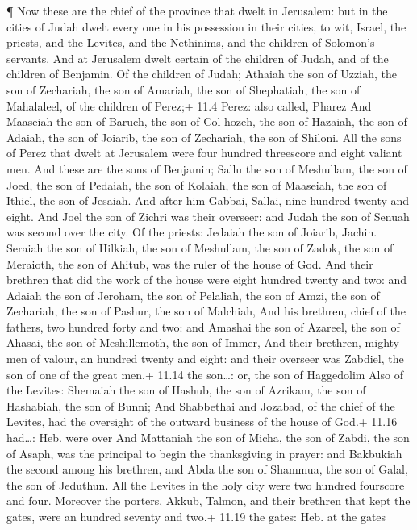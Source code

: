  ¶ Now these are the chief of the province that dwelt in
Jerusalem: but in the cities of Judah dwelt every one in his possession
in their cities, to wit, Israel, the priests, and the Levites, and the
Nethinims, and the children of Solomon's servants.  And at
Jerusalem dwelt certain of the children of Judah, and of the children of
Benjamin. Of the children of Judah; Athaiah the son of Uzziah, the son
of Zechariah, the son of Amariah, the son of Shephatiah, the son of
Mahalaleel, of the children of Perez;+ 11.4 Perez: also called, Pharez
 And Maaseiah the son of Baruch, the son of Col-hozeh, the
son of Hazaiah, the son of Adaiah, the son of Joiarib, the son of
Zechariah, the son of Shiloni.  All the sons of Perez that
dwelt at Jerusalem were four hundred threescore and eight valiant men.
 And these are the sons of Benjamin; Sallu the son of
Meshullam, the son of Joed, the son of Pedaiah, the son of Kolaiah, the
son of Maaseiah, the son of Ithiel, the son of Jesaiah.  And
after him Gabbai, Sallai, nine hundred twenty and eight. 
And Joel the son of Zichri was their overseer: and Judah the son of
Senuah was second over the city.  Of the priests: Jedaiah
the son of Joiarib, Jachin.  Seraiah the son of Hilkiah,
the son of Meshullam, the son of Zadok, the son of Meraioth, the son of
Ahitub, was the ruler of the house of God.  And their
brethren that did the work of the house were eight hundred twenty and
two: and Adaiah the son of Jeroham, the son of Pelaliah, the son of
Amzi, the son of Zechariah, the son of Pashur, the son of Malchiah,
 And his brethren, chief of the fathers, two hundred forty
and two: and Amashai the son of Azareel, the son of Ahasai, the son of
Meshillemoth, the son of Immer,  And their brethren, mighty
men of valour, an hundred twenty and eight: and their overseer was
Zabdiel, the son of one of the great men.+ 11.14 the son\ldots: or, the
son of Haggedolim  Also of the Levites: Shemaiah the son of
Hashub, the son of Azrikam, the son of Hashabiah, the son of Bunni;
 And Shabbethai and Jozabad, of the chief of the Levites,
had the oversight of the outward business of the house of God.+ 11.16
had\ldots: Heb. were over  And Mattaniah the son of Micha,
the son of Zabdi, the son of Asaph, was the principal to begin the
thanksgiving in prayer: and Bakbukiah the second among his brethren, and
Abda the son of Shammua, the son of Galal, the son of Jeduthun.
 All the Levites in the holy city were two hundred
fourscore and four.  Moreover the porters, Akkub, Talmon,
and their brethren that kept the gates, were an hundred seventy and
two.+ 11.19 the gates: Heb. at the gates

